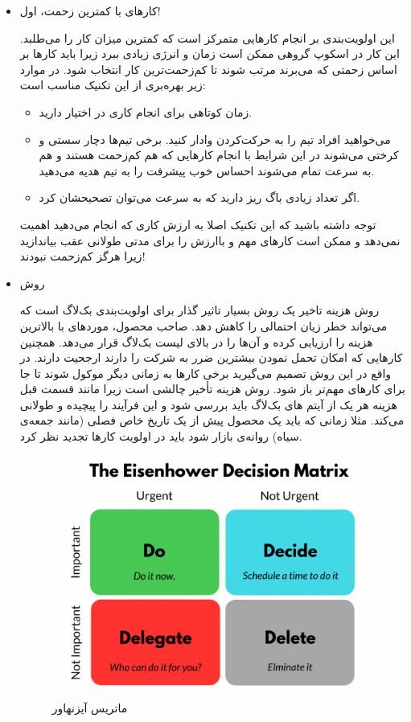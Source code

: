 {\begin{itemize}
    \item کار‌های با کمترین زحمت، اول!
    
    این اولویت‌بندی بر انجام کارهایی متمرکز است که کمترین میزان کار را می‌طلبد. این کار در اسکوپ گروهی ممکن است زمان و انرژی زیادی ببرد زیرا باید کارها بر اساس زحمتی که می‌برند مرتب شوند تا کم‌زحمت‌ترین کار انتخاب شود. در موارد زیر بهره‌بری از این تکنیک مناسب است:
    \begin{itemize}
        \item زمان کوتاهی برای انجام کاری در اختیار دارید.
        \item می‌خواهید افراد تیم را به حرکت‌کردن وادار کنید. برخی تیم‌ها دچار سستی و کرختی می‌شوند در این شرایط با انجام کارهایی که هم کم‌زحمت هستند و هم به سرعت تمام می‌شوند احساس خوب پیشرفت را به تیم هدیه می‌دهید.
        \item اگر تعداد زیادی باگ ریز دارید که به سرعت می‌توان تصحیحشان کرد.
    \end{itemize}
    توجه داشته باشید که این تکنیک اصلا به ارزش کاری که انجام می‌دهید اهمیت نمی‌دهد و ممکن است کارهای مهم و باارزش را برای مدتی طولانی عقب بیاندازید زیرا هرگز کم‌زحمت نبودند!

    \item روش 
    
    روش هزینه تاخیر یک روش بسیار تاثیر گذار برای اولویت‌بندی بک‌لاگ است که می‌تواند خطر زیان احتمالی را کاهش دهد. صاحب محصول، مورد‌های با بالاترین هزینه را ارزیابی کرده و آن‌ها را در بالای لیست بک‌لاگ قرار می‌دهد. همچنین کارهایی که امکان تحمل نمودن بیشترین ضرر به شرکت را دارند ارجحیت دارند. در واقع در این روش تصمیم می‌گیرید برخی کارها به زمانی دیگر موکول شوند تا جا برای کارهای مهم‌تر باز شود. روش هزینه تأخیر چالشی است زیرا مانند قسمت قبل هزینه هر یک از آیتم های بک‌لاگ باید بررسی شود و این فرآیند را پیچیده و طولانی می‌کند. مثلا زمانی که باید یک محصول پیش از یک تاریخ خاص فصلی (مانند جمعه‌ی سیاه) روانه‌ی بازار شود باید در اولویت کارها تجدید نظر کرد.
    
 \begin{figure}[h]
   	\centering
   	\includegraphics[scale=0.3]{figs/3-2}
   	\caption{ماتریس آیزنهاور}
\end{figure}


\end{itemize}}

